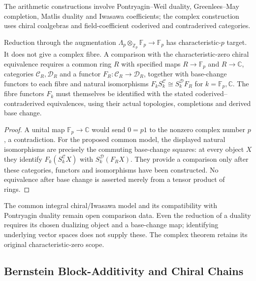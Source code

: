 The arithmetic constructions involve Pontryagin--Weil duality,
Greenlees--May completion, Matlis duality and Iwasawa coefficients;
the complex construction uses chiral coalgebras and field-coefficient
coderived and contraderived categories.

\begin{proposition}
\label{v4-arith:w6-i:thm:W5-D-alignment}
Reduction through the augmentation
$\Lambda_p\otimes_{\mathbb Z_p}\mathbb F_p\to\mathbb F_p$
has characteristic-$p$ target. It does not give a complex fibre.
A comparison with the characteristic-zero chiral equivalence requires
a common ring $R$ with specified maps $R\to\mathbb F_p$ and
$R\to\mathbb C$, categories $\mathcal C_R,\mathcal D_R$ and a functor
$F_R:\mathcal C_R\to\mathcal D_R$, together with base-change
functors to each fibre and natural isomorphisms
$F_k S_k^{\mathcal C}\cong S_k^{\mathcal D}F_R$
for $k=\mathbb F_p,\mathbb C$.
The fibre functors $F_k$ must themselves be identified with the
stated coderived--contraderived equivalences, using their actual
topologies, completions and derived base change.
\end{proposition}
\begin{proof}
A unital map $\mathbb F_p\to\mathbb C$ would send
$0=p1$ to the nonzero complex number $p$, a contradiction.
For the proposed common model, the displayed natural isomorphisms
are precisely the commuting base-change squares: at every object
$X$ they identify $F_k(S_k^{\mathcal C}X)$ with
$S_k^{\mathcal D}(F_RX)$. They provide a comparison only after
these categories, functors and isomorphisms have been constructed.
No equivalence after base change is asserted merely from a tensor
product of rings.
\end{proof}
\begin{remark}
\label{v4-arith:w6-i:rem:W5-D-overextension}
The common integral chiral/Iwasawa model and its compatibility with
Pontryagin duality remain open comparison data. Even the reduction
of a duality requires its chosen dualizing object and a base-change
map; identifying underlying vector spaces does not supply these.
The complex theorem retains its original characteristic-zero scope.
\end{remark}

\subsection{Bernstein Block-Additivity and Chiral Chains}
\label{v4-arith:w6-i:W5-F-alignment}


